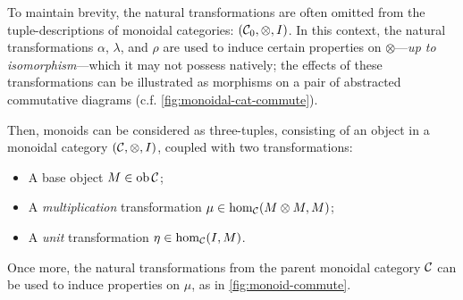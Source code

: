 \documentclass[10pt,a4paper,reqno]{amsart}
\numberwithin{figure}{section}
\begin{document}
To maintain brevity, the natural transformations are often omitted from the
tuple-descriptions of monoidal categories: $(\mathcal{C}_0, \otimes, I)$. In this
context, the natural transformations $\alpha$, $\lambda$, and $\rho$ are used to
induce certain properties on $\otimes$---\emph{up to isomorphism}---which it
may not possess natively; the effects of these transformations can be
illustrated as morphisms on a pair of abstracted commutative diagrams (c.f.
\autoref{fig:monoidal-cat-commute}).

Then, monoids can be considered as three-tuples, consisting of an object in a
monoidal category $(\mathcal{C}, \otimes, I)$, coupled with two transformations:
\begin{itemize}
        \item A base object $M \in \operatorname{ob} \mathcal{C}$;
        \item A \emph{multiplication} transformation $\mu \in \hom_\mathcal{C}
        (M \otimes M, M)$;
        \item A \emph{unit} transformation $\eta \in \hom_\mathcal{C} (I, M)$.
\end{itemize}
Once more, the natural transformations from the parent monoidal category
$\mathcal{C}$ can be used to induce properties on $\mu$, as in
\autoref{fig:monoid-commute}.
\end{document}
